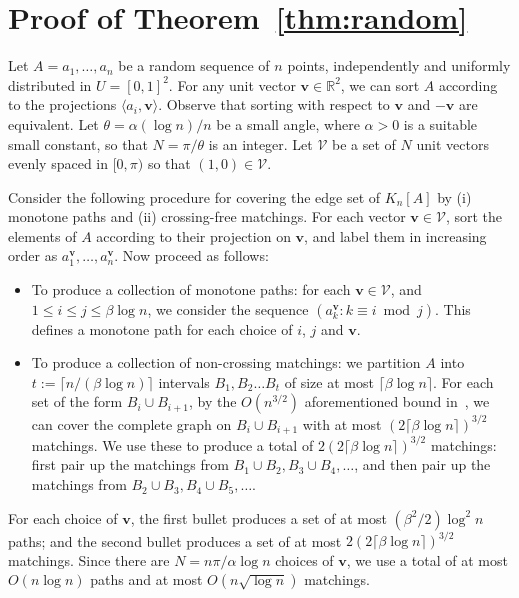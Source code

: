 \documentclass[a4paper,USenglish]{lipics-v2021}
\def\V{\mathcal V}
\begin{document}
\section{Proof of Theorem~\ref{thm:random}} 

Let $A=a_1,\ldots,a_n$ be a random sequence of $n$ points, independently and uniformly distributed in $U=[0,1]^2$.
For any unit vector $\mathbf{v} \in {\mathbb R}^2$, we can sort $A$ according to the projections
 $\langle a_i, \mathbf{v}\rangle$.
Observe that sorting with respect to $\mathbf{v}$ and $-\mathbf{v}$ are equivalent. 
Let $\theta=\alpha(\log n) / n$ be a small angle, where $\alpha>0$ is a suitable small constant,
so that $N=\pi/\theta$ is an integer.
Let $\V$ be a set of $N$ unit vectors evenly spaced in $[0,\pi)$ so that $(1,0) \in \V$.  

Consider the following procedure for covering the edge set of $K_n[A]$ by (i) monotone paths
and (ii) crossing-free matchings. For each vector $\mathbf{v} \in \V$, 
sort the elements of $A$ according to their projection on $\mathbf{v}$, and label them in increasing order as  $a_1^\mathbf{v},\dots,a_n^\mathbf{v}$. Now proceed as follows:


\begin{itemize}
\item[$\bullet$] To produce a collection of monotone paths: for each $\mathbf{v} \in \V$, and $1\le i \le j\le \beta\log n$,
we consider the sequence $(a_k^\mathbf{v}:k\equiv i\bmod j)$. This defines a monotone path for each choice of $i$, $j$ and
$\mathbf{v}$.
\item[$\bullet$] To produce a collection of non-crossing matchings: we partition $A$ into 
$t:=\lceil n/(\beta\log n) \rceil$ intervals $B_1,B_2\dots B_t$ of size at most $\lceil\beta\log n\rceil$. 
For each set of the form $B_i\cup B_{i+1}$, by the $O(n^{3/2})$ aforementioned bound in~\cite{ADH+05},
we can cover the complete graph on  $B_i\cup B_{i+1}$ with at most $(2\lceil\beta\log n\rceil)^{3/2}$ matchings. 
We use these to produce a total of $2(2\lceil\beta\log n\rceil)^{3/2}$ matchings: first pair up the matchings 
from $B_1\cup B_2, B_3\cup B_4, \dots$, and then pair up the matchings from $B_2\cup B_3, B_4\cup B_5, \dots$.
\end{itemize}

For each choice of $\mathbf{v}$, the first bullet produces a set of at most $(\beta^2/2)\log^2n$ paths; 
and the second bullet produces a set of at most $2(2\lceil\beta\log n\rceil)^{3/2}$ matchings.  
Since there are $N=n\pi/\alpha\log n$ choices of $\mathbf{v}$, we use a total of at most $O(n\log n)$ paths 
and at most $O(n\sqrt{\log n})$ matchings.
\end{document}
